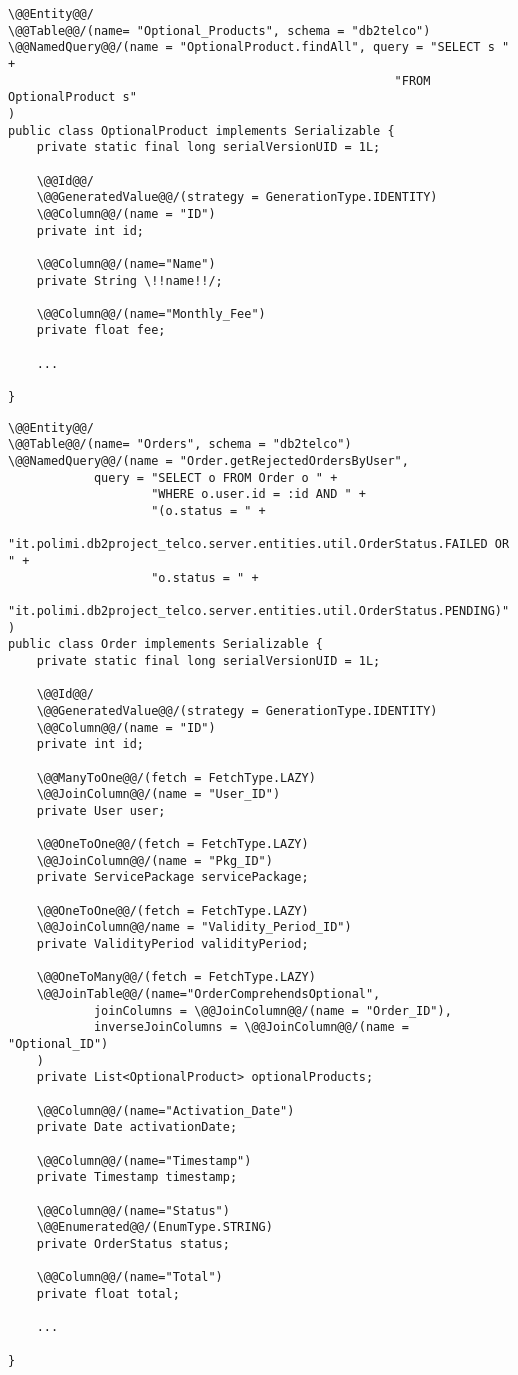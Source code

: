 \begin{lstlisting}[style = JPA]
\@@Entity@@/
\@@Table@@/(name= "Optional_Products", schema = "db2telco")
\@@NamedQuery@@/(name = "OptionalProduct.findAll", query = "SELECT s " + 
                                                      "FROM OptionalProduct s"
)
public class OptionalProduct implements Serializable {
    private static final long serialVersionUID = 1L;

    \@@Id@@/
    \@@GeneratedValue@@/(strategy = GenerationType.IDENTITY)
    \@@Column@@/(name = "ID")
    private int id;

    \@@Column@@/(name="Name")
    private String \!!name!!/;

    \@@Column@@/(name="Monthly_Fee")
    private float fee;
    
    ...

}
\end{lstlisting}

\begin{lstlisting}[style = JPA]
\@@Entity@@/
\@@Table@@/(name= "Orders", schema = "db2telco")
\@@NamedQuery@@/(name = "Order.getRejectedOrdersByUser", 
            query = "SELECT o FROM Order o " +
                    "WHERE o.user.id = :id AND " +
                    "(o.status = " +
    "it.polimi.db2project_telco.server.entities.util.OrderStatus.FAILED OR " +
                    "o.status = " +
    "it.polimi.db2project_telco.server.entities.util.OrderStatus.PENDING)"
)
public class Order implements Serializable {
    private static final long serialVersionUID = 1L;

    \@@Id@@/
    \@@GeneratedValue@@/(strategy = GenerationType.IDENTITY)
    \@@Column@@/(name = "ID")
    private int id;

    \@@ManyToOne@@/(fetch = FetchType.LAZY)
    \@@JoinColumn@@/(name = "User_ID")
    private User user;

    \@@OneToOne@@/(fetch = FetchType.LAZY)
    \@@JoinColumn@@/(name = "Pkg_ID")
    private ServicePackage servicePackage;

    \@@OneToOne@@/(fetch = FetchType.LAZY)
    \@@JoinColumn@@/name = "Validity_Period_ID")
    private ValidityPeriod validityPeriod;

    \@@OneToMany@@/(fetch = FetchType.LAZY)
    \@@JoinTable@@/(name="OrderComprehendsOptional",
            joinColumns = \@@JoinColumn@@/(name = "Order_ID"),
            inverseJoinColumns = \@@JoinColumn@@/(name = "Optional_ID")
    )
    private List<OptionalProduct> optionalProducts;

    \@@Column@@/(name="Activation_Date")
    private Date activationDate;

    \@@Column@@/(name="Timestamp")
    private Timestamp timestamp;

    \@@Column@@/(name="Status")
    \@@Enumerated@@/(EnumType.STRING)
    private OrderStatus status;

    \@@Column@@/(name="Total")
    private float total;
    
    ...

}
\end{lstlisting}

